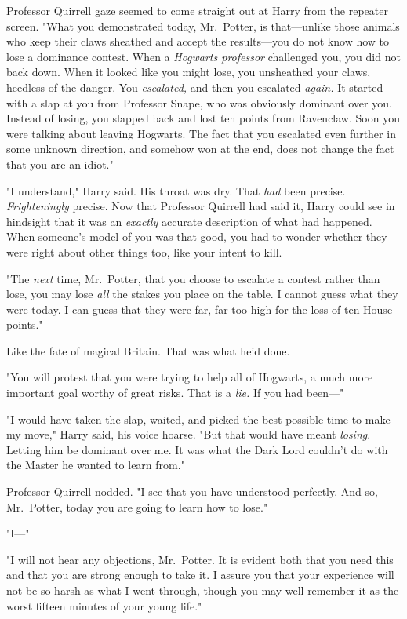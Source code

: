Professor Quirrell gaze seemed to come straight out at Harry from the repeater 
screen. "What you demonstrated today, Mr.~Potter, is that---unlike those 
animals who keep their claws sheathed and accept the results---you do not know 
how to lose a dominance contest. When a \emph{Hogwarts professor} challenged 
you, you did not back down. When it looked like you might lose, you unsheathed 
your claws, heedless of the danger. You \emph{escalated,} and then you 
escalated \emph{again.} It started with a slap at you from Professor Snape, who 
was obviously dominant over you. Instead of losing, you slapped back and lost 
ten points from Ravenclaw. Soon you were talking about leaving Hogwarts. The 
fact that you escalated even further in some unknown direction, and somehow won 
at the end, does not change the fact that you are an idiot."

"I understand," Harry said. His throat was dry. That \emph{had} been precise. 
\emph{Frighteningly} precise. Now that Professor Quirrell had said it, Harry 
could see in hindsight that it was an \emph{exactly} accurate description of 
what had happened. When someone's model of you was that good, you had to wonder 
whether they were right about other things too, like your intent to kill.

"The \emph{next} time, Mr.~Potter, that you choose to escalate a contest rather 
than lose, you may lose \emph{all} the stakes you place on the table. I cannot 
guess what they were today. I can guess that they were far, far too high for 
the loss of ten House points."

Like the fate of magical Britain. That was what he'd done.

"You will protest that you were trying to help all of Hogwarts, a much more 
important goal worthy of great risks. That is a \emph{lie.} If you had been---"

"I would have taken the slap, waited, and picked the best possible time to make 
my move," Harry said, his voice hoarse. "But that would have meant 
\emph{losing}. Letting him be dominant over me. It was what the Dark Lord 
couldn't do with the Master he wanted to learn from."

Professor Quirrell nodded. "I see that you have understood perfectly. And so, 
Mr.~Potter, today you are going to learn how to lose."

"I---"

"I will not hear any objections, Mr.~Potter. It is evident both that you need 
this and that you are strong enough to take it. I assure you that your 
experience will not be so harsh as what I went through, though you may well 
remember it as the worst fifteen minutes of your young life."

